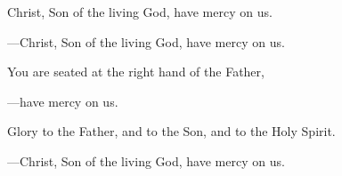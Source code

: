 \responsory
\begin{hangpar}

Christ, Son of the living God, have mercy on us.

{\color{red}---\thinspace}Christ, Son of the living God, have mercy on us.

\medskip You are seated at the right hand of the Father,

{\color{red}---\thinspace}have mercy on us.

\medskip Glory to the Father, and to the Son, and to the Holy Spirit.

{\color{red}---\thinspace}Christ, Son of the living God, have mercy on us.
\end{hangpar}
